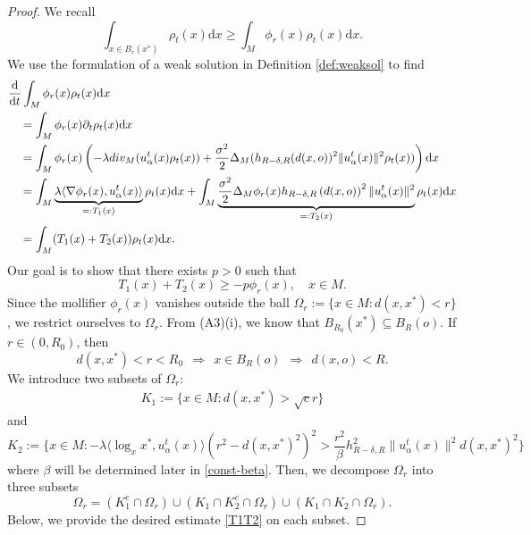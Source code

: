 \documentclass[10pt,a4paper]{amsart}
\def\d{\mathrm{d}}
\newcommand{\dist}{d}%
\newcommand{\p}{o}%
\begin{document}
\begin{proof}
We recall
\[
\int_{x\in B_r(x^*)} \rho_t(x) \d x  \geq \int_M \phi_r(x) \rho_t(x) \d x .
\]
We use the formulation of a weak solution in Definition \ref{def:weaksol} to find
\begin{align*}
&\frac{\d}{\d t} \int_M \phi_r(x) \rho_t(x) \d x \\
&\quad = \int_M \phi_r(x) \partial_t \rho_t(x) \d x  \\
&\quad =\int_M   \phi_r(x) \left(   -\lambda \textup{div}_M (u_\alpha^t(x) \rho_t(x) ) + \frac{\sigma^2}{2} \Delta_M (  h_{R-\delta,R}(d(x,o))^2 \|u_\alpha^t(x)\|^2 \rho_t(x) )        \right) \d x \\ 
&\quad =   \int_M  \underbrace{  \lambda   \langle  \nabla \phi_r(x), u_\alpha^t(x) \rangle}_{=:T_1(x)} \rho_t(x) \d x        + \int_M \underbrace{ \frac{\sigma^2}{2}\Delta_M \phi_r(x) h_{R-\delta,R}\left(\dist(x, \p)\right)^2 \|u_\alpha^t(x)\|^2 }_{=: T_2(x)}\rho_t(x) \d x  \\
&\quad  = \int_M (T_1(x) + T_2(x) ) \rho_t(x) \d x .
\end{align*}
Our goal is to show that there exists $p>0$ such that 
\begin{equation} \label{T1T2}
T_1(x) + T_2(x) \geq -p\phi_r(x),\quad x\in M .
\end{equation}
Since the mollifier $\phi_r(x)$ vanishes outside the ball $\Omega_r := \{ x\in M : d(x,x^*) <r\}$, we restrict ourselves to $\Omega_r$.  From (A3)(i), we know that $B_{R_0}(x^*) \subseteq B_R(o)$. If $r\in (0,R_0)$, then
\[
d(x,x^*)<r <R_0 ~~ \Longrightarrow ~~x\in B_R(o) ~~ \Longrightarrow ~~d(x,o)<R.
\]
 We introduce two subsets of $\Omega_r$:
\begin{align*}
K_1 := \{ x\in M: d(x,x^*) >\sqrt{c}r\}
\end{align*}
and  
\begin{equation} \label{K2}
K_2 := \{ x\in M: - \lambda \langle \log_xx^*,u_\alpha^t(x)\rangle (r^2 - d(x,x^*)^2)^2 > \frac{r^2}{\beta}h_{R-\delta,R}^2 \|u_\alpha^t(x)\|^2 d(x,x^*)^2 \}
\end{equation}
where $\beta$ will be determined  later in \eqref{const-beta}. Then, we decompose $\Omega_r$ into three subsets
\[
\Omega_r = (K_1^c \cap \Omega_r) \cup (K_1\cap K_2^c \cap\Omega_r) \cup ( K_1\cap K_2\cap \Omega_r).
\]
Below,  we provide the desired estimate \eqref{T1T2} on each subset. \newline



\end{proof}
\end{document}
